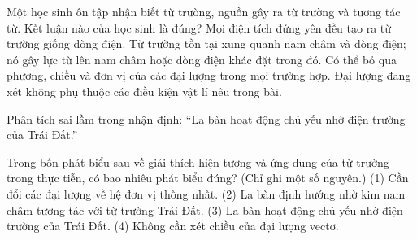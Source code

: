 \begin{ex}
Một học sinh ôn tập nhận biết từ trường, nguồn gây ra từ trường và tương tác từ. Kết luận nào của học sinh là đúng?
\choice
{Mọi điện tích đứng yên đều tạo ra từ trường giống dòng điện.}
{\True Từ trường tồn tại xung quanh nam châm và dòng điện; nó gây lực từ lên nam châm hoặc dòng điện khác đặt trong đó.}
{Có thể bỏ qua phương, chiều và đơn vị của các đại lượng trong mọi trường hợp.}
{Đại lượng đang xét không phụ thuộc các điều kiện vật lí nêu trong bài.}
\end{ex}

\begin{bt}
Phân tích sai lầm trong nhận định: “La bàn hoạt động chủ yếu nhờ điện trường của Trái Đất.”
\end{bt}

\begin{ex}
Trong bốn phát biểu sau về giải thích hiện tượng và ứng dụng của từ trường trong thực tiễn, có bao nhiêu phát biểu đúng? (Chỉ ghi một số nguyên.) (1) Cần đổi các đại lượng về hệ đơn vị thống nhất. (2) La bàn định hướng nhờ kim nam châm tương tác với từ trường Trái Đất. (3) La bàn hoạt động chủ yếu nhờ điện trường của Trái Đất. (4) Không cần xét chiều của đại lượng vectơ.
\end{ex}

